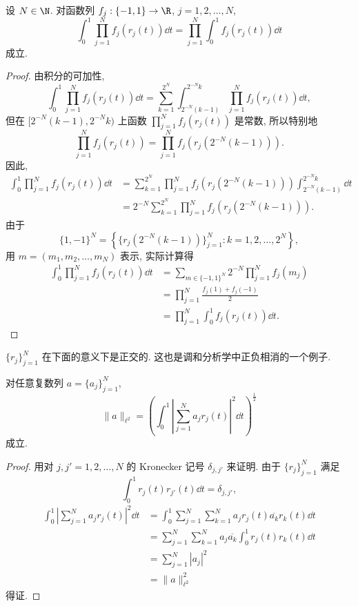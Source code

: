 \begin{proposition}\label{prop:1.1}
设 $N \in \N$. 对函数列 $f_{j}: \{-1, 1\} \to \R$, $j = 1, 2, \ldots, N$,
\[
\int_{0}^{1} \prod_{j=1}^{N} f_{j}(r_{j}(t)) \dd t = \prod_{j=1}^{N} \int_{0}^{1} f_{j}(r_{j}(t)) \dd t
\]
成立.
\end{proposition}

\begin{proof}
由积分的可加性,
\[
\int_{0}^{1} \prod_{j=1}^{N} f_{j}(r_{j}(t)) \dd t = \sum_{k=1}^{2^{N}} \int_{2^{-N}(k-1)}^{2^{-N}k} \prod_{j=1}^{N} f_{j}(r_{j}(t)) \dd t,
\]
但在 $[2^{-N}(k-1), 2^{-N}k)$ 上函数 $\prod_{j=1}^{N} f_{j}(r_{j}(t))$ 是常数, 所以特别地
\[
\prod_{j=1}^{N} f_{j}(r_{j}(t)) = \prod_{j=1}^{N} f_{j}(r_{j}(2^{-N}(k-1))).
\]
因此,
\begin{align*}
\int_{0}^{1} \prod_{j=1}^{N} f_{j}(r_{j}(t)) \dd t & = \sum_{k=1}^{2^{N}} \prod_{j=1}^{N} f_{j}(r_{j}(2^{-N}(k-1)))\int_{2^{-N}(k-1)}^{2^{-N}k} \dd t \\
& = 2^{-N}\sum_{k=1}^{2^{N}} \prod_{j=1}^{N} f_{j}(r_{j}(2^{-N}(k-1))).
\end{align*}
由于
\[
\{1, -1\}^{N} = \left\{\{r_{j}(2^{-N}(k-1))\}_{j=1}^{N} : k = 1, 2, \ldots, 2^{N}\right\},
\]
用 $m = (m_{1}, m_{2}, \ldots, m_{N})$ 表示, 实际计算得
\begin{align*}
\int_{0}^{1} \prod_{j=1}^{N} f_{j}(r_{j}(t)) \dd t & = \sum_{m \in \{-1, 1\}^{N}} 2^{-N}\prod_{j=1}^{N} f_{j}(m_{j}) \\
& = \prod_{j=1}^{N} \frac{f_{j}(1) + f_{j}(-1)}{2} \\
& = \prod_{j=1}^{N} \int_{0}^{1} f_{j}(r_{j}(t)) \dd t.
\end{align*}
\end{proof}

$\{r_{j}\}_{j=1}^{N}$ 在下面的意义下是正交的. 这也是调和分析学中正负相消的一个例子.

\begin{lemma}\label{lem:1.2}
对任意复数列 $a = \{a_{j}\}_{j=1}^{N}$,
\[
\| a \|_{\ell^{2}} = \left(\int_{0}^{1} \left| \sum_{j=1}^{N} a_{j}r_{j}(t) \right|^{2} \dd t\right)^{\frac{1}{2}}
\]
成立.
\end{lemma}

\begin{proof}
用对 $j, j' = 1, 2, \ldots, N$ 的 Kronecker 记号 $\delta_{j,j'}$ 来证明. 由于 $\{r_{j}\}_{j=1}^{N}$ 满足
\[
\int_{0}^{1} r_{j}(t)r_{j'}(t) \dd t = \delta_{j,j'},
\]
\begin{align*}
\int_{0}^{1} \left| \sum_{j=1}^{N} a_{j}r_{j}(t) \right|^{2} \dd t & = \int_{0}^{1} \sum_{j=1}^{N}\sum_{k=1}^{N} a_{j}r_{j}(t)\overline{a_{k}}r_{k}(t) \dd t \\
& = \sum_{j=1}^{N}\sum_{k=1}^{N} a_{j}\overline{a_{k}}\int_{0}^{1} r_{j}(t)r_{k}(t) \dd t \\
& = \sum_{j=1}^{N} |a_{j}|^{2} \\
& = \| a \|_{\ell^{2}}^{2}
\end{align*}
得证.
\end{proof}

